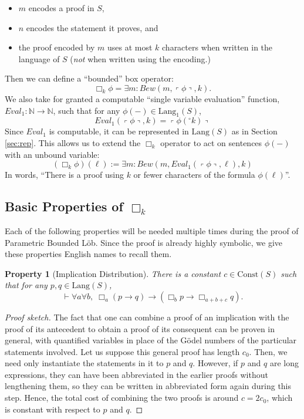 \documentclass[onecolumn]{miri-tech-article}
\newtheorem{property}{Property}
\numberwithin{equation}{section}
\theoremstyle{definition}
\newcommand{\NN}{\mathbb{N}}
\newcommand{\proves}[1]{\underset{#1}{\vdash}}
\newcommand{\bx}[1]{\Box_{#1}}
\newcommand{\Lang}{\mathrm{Lang}}
\newcommand{\Const}{\mathrm{Const}}
\renewcommand{\implies}{\rightarrow}
\renewcommand{\to}{\rightarrow}
\newcommand{\qquote}[1]{\left\ulcorner #1 \right\urcorner}
\newcommand{\numeral}{{}^\circ}
\renewcommand{\-}{^{-1}}
\begin{document}
\begin{itemize}
\item $m$ encodes a proof in $S$,
\item $n$ encodes the statement it proves, and
\item the proof encoded by $m$ uses at most $k$ characters when written in the language of $S$ ({\em not} when written using the encoding.)
\end{itemize}
%
Then we can define a ``bounded'' box operator:
$$\bx{k}\phi = \exists m : Bew(m,\qquote{\phi},k).$$
We also take for granted a computable ``single variable evaluation'' function, $Eval_1:\NN\to\NN$, such that for any $\phi(-)\in\Lang_1(S)$, 
$$Eval_1(\qquote\phi,k) = \qquote{\phi(\numeral k)}$$
Since $Eval_1$ is computable, it can be represented in $\Lang(S)$ as in Section \ref{sec:rep}.  
This allows us to extend the $\bx{k}$ operator to act on sentences $\phi(-)$ with an unbound variable:
%
$$(\bx{k}\phi)(\ell) := \exists m : Bew(m,Eval_1(\qquote\phi,\ell),k)$$
%
In words, ``There is a proof using $k$ or fewer characters of the formula $\phi(\ell)$''.

\subsection{Basic Properties of \texorpdfstring{$\bx{k}$}{box k}}
Each of the following properties will be needed multiple times during the proof of Parametric Bounded L\"{o}b.  Since the proof is already highly symbolic, we give these properties English names to recall them. 

\begin{property}[Implication Distribution]
There is a constant $c\in \Const(S)$ such that for any $p,q\in\Lang(S)$,
$$\proves{} \forall a\forall b,\; \bx{a}(p\implies q) \implies (\bx{b}p \implies \bx{a+b+c} q).$$
\end{property}

\begin{proof}[Proof sketch]
The fact that one can combine a proof of an implication with the proof of its antecedent to obtain a proof of its consequent can be proven in general, with quantified variables in place of the G\"{o}del numbers of the particular statements involved.  Let us suppose this general proof has length $c_0$.  Then, we need only instantiate the statements in it to $p$ and $q$.  However, if $p$ and $q$ are long expressions, they can have been abbreviated in the earlier proofs without lengthening them, so they can be written in abbreviated form again during this step.  Hence, the total cost of combining the two proofs is around $c=2c_0$, which is constant with respect to $p$ and $q$.
\end{proof}
\end{document}
